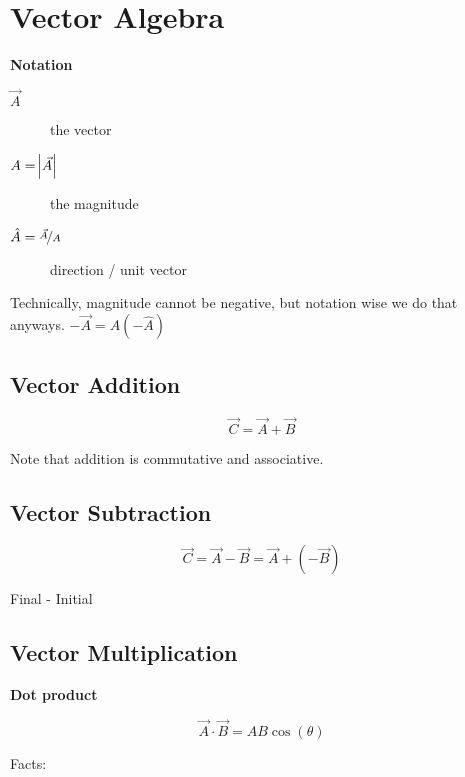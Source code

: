 \section{Vector Algebra}

\textbf{Notation}

\begin{description}
	\item[$\vec{A}$] the vector
	\item[$A = \abs{\vec{A}}$] the magnitude
	\item[$\hat{A} = \nicefrac{\vec{A}}{A}$] direction / unit vector
\end{description}

\begin{remark}
	Technically, magnitude cannot be negative, but notation wise we do that anyways. $- \vec{A} = A (- \hat{A})$
\end{remark}

\subsection{Vector Addition}

\begin{equation}
	\vec{C} = \vec{A} + \vec{B}
\end{equation}

Note that addition is commutative and associative. 

\subsection{Vector Subtraction}

\begin{equation}
	\vec{C} = \vec{A} - \vec{B} = \vec{A} + (-\vec{B})
\end{equation}

Final - Initial

\subsection{Vector Multiplication}

\textbf{Dot product}

\begin{equation}
	\vec{A} \cdot \vec{B} = AB \cos(\theta)
\end{equation}

Facts:

